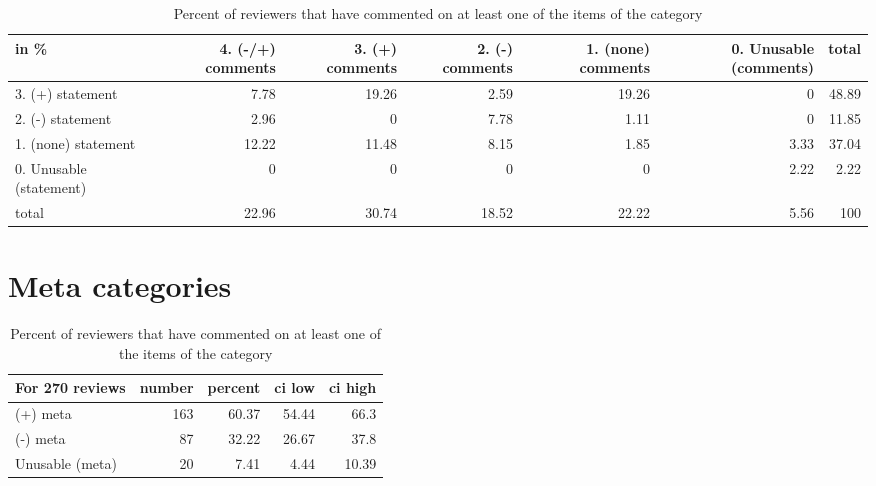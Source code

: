 \documentclass{article}
\begin{document}
\begin{table}[H]

\centering

\begin{tabular}{lrrrrrr}
\hline
 in \%                    &   4. (-/+) comments &   3. (+) comments &   2. (-) comments &   1. (none) comments &   0. Unusable (comments) &   total \\
\hline
 3. (+) statement        &                7.78 &             19.26 &              2.59 &                19.26 &                     0    &   48.89 \\
 2. (-) statement        &                2.96 &              0    &              7.78 &                 1.11 &                     0    &   11.85 \\
 1. (none) statement     &               12.22 &             11.48 &              8.15 &                 1.85 &                     3.33 &   37.04 \\
 0. Unusable (statement) &                0    &              0    &              0    &                 0    &                     2.22 &    2.22 \\
 total                   &               22.96 &             30.74 &             18.52 &                22.22 &                     5.56 &  100    \\
\hline
\end{tabular}\caption{Percent of reviewers that have commented on at least one of the items of the category}

\end{table}



\section{Meta categories} 

\begin{table}[H]

\centering

\begin{tabular}{lrrrr}
\hline
 For 270 reviews   &   number &   percent &   ci low &   ci high \\
\hline
 (+) meta          &      163 &     60.37 &    54.44 &     66.3  \\
 (-) meta          &       87 &     32.22 &    26.67 &     37.8  \\
 Unusable (meta)   &       20 &      7.41 &     4.44 &     10.39 \\
\hline
\end{tabular}\caption{Percent of reviewers that have commented on at least one of the items of the category}

\end{table}
\end{document}
